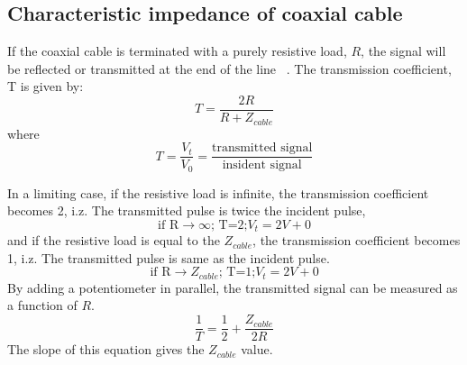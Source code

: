 \documentclass[12pt,a4paper,bold]{thesis}
\theoremstyle{thm}
\theoremstyle{definition}
\begin{document}
\subsection{Characteristic impedance of coaxial cable}
\indent\indent\indent If the coaxial cable is terminated with a purely resistive load, $R$, the signal will be reflected or transmitted at the end of the line ~\cite{fonseca2007very}. The transmission coefficient, T is given by:
\[T=\frac{2R}{R+Z_{cable}}\]
where 
\[T=\frac{V_t}{V_0}=\frac{\text{transmitted signal}}{\text{insident signal}}\]

In a limiting case, if the resistive load is infinite, the transmission coefficient becomes 2, i.z. The transmitted pulse is twice the incident pulse,
\[\text{if R}\rightarrow\infty\text{; T=2;}V_t=2V+0 \]
 and if the resistive load is equal to the $Z_{cable}$,  the transmission coefficient becomes 1, i.z. The transmitted pulse is same as the incident pulse.
\[\text{if R}\rightarrow Z_{cable}\text{; T=1;}V_t=2V+0 \]
By adding a potentiometer in parallel, the transmitted signal can be measured as a function of $R$.
\[\frac{1}{T}=\frac{1}{2} + \frac{Z_{cable}}{2R}\]
The slope of this equation gives the $Z_{cable}$ value.
\end{document}
